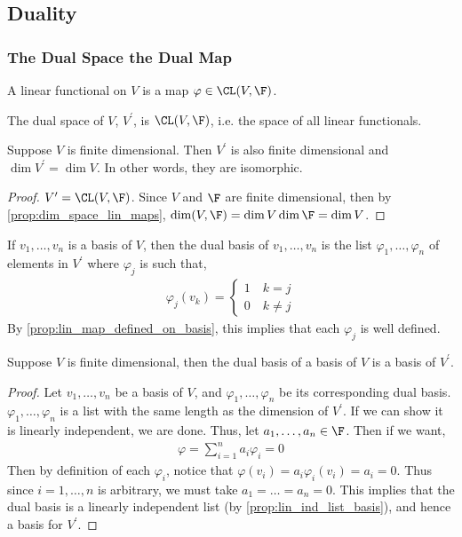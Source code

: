 \documentclass{article}
\begin{document}
\subsection{Duality}
\subsubsection{The Dual Space the Dual Map}
  \begin{defn}
    A linear functional on $V$ is a map $\varphi \in \CL(V, \F)$.
  \end{defn}
  \begin{defn}
    The dual space of $V$, $V^\prime$, is $\CL(V, \F)$, i.e. the space of all linear functionals.
  \end{defn}
  \begin{prop}
    Suppose $V$ is finite dimensional. Then $V^\prime$ is also finite dimensional and $\dim V^\prime = \dim V$. In other words, they are isomorphic.
  \end{prop}
  \begin{proof}
    $V^\prime = \CL(V, \F)$. Since $V$ and $\F$ are finite dimensional, then by \ref{prop:dim_space_lin_maps}, $\dim(V, \F) = \dim V\dim\F = \dim V$.
  \end{proof}
  \begin{defn}
    If $v_1, \dots, v_n$ is a basis of $V$, then the dual basis of $v_1, \dots, v_n$ is the list $\varphi_1, \dots, \varphi_n$ of elements in $V^\prime$ where $\varphi_j$ is such that,
    \begin{align*}
      \varphi_j(v_k) = 
        \begin{cases}
          1 \quad k = j \\
          0 \quad k \neq j
        \end{cases}
    \end{align*}
    By \ref{prop:lin_map_defined_on_basis}, this implies that each $\varphi_j$ is well defined.
  \end{defn}
  \begin{prop}
    Suppose $V$ is finite dimensional, then the dual basis of a basis of $V$ is a basis of $V^\prime$.
  \end{prop}
  \begin{proof}
    Let $v_1, \dots, v_n$ be a basis of $V$, and $\varphi_1, \dots, \varphi_n$ be its corresponding dual basis. $\varphi_1, \dots, \varphi_n$ is a list with the same length as the dimension
    of $V^\prime$. If we can show it is linearly independent, we are done. Thus, let $a_1, \dots, a_n \in \F$. Then if we want,
    \begin{align*}
      \varphi = \sum_{i = 1}^{n}a_i\varphi_i = 0
    \end{align*}
    Then by definition of each $\varphi_i$, notice that $\varphi(v_i) = a_i\varphi_i(v_i) = a_i = 0$. Thus since $i = 1, \dots, n$ is arbitrary, we must take $a_1 = \dots = a_n = 0$. This
    implies that the dual basis is a linearly independent list (by \eqref{prop:lin_ind_list_basis}), and hence a basis for $V^\prime$.
  \end{proof}
\end{document}
